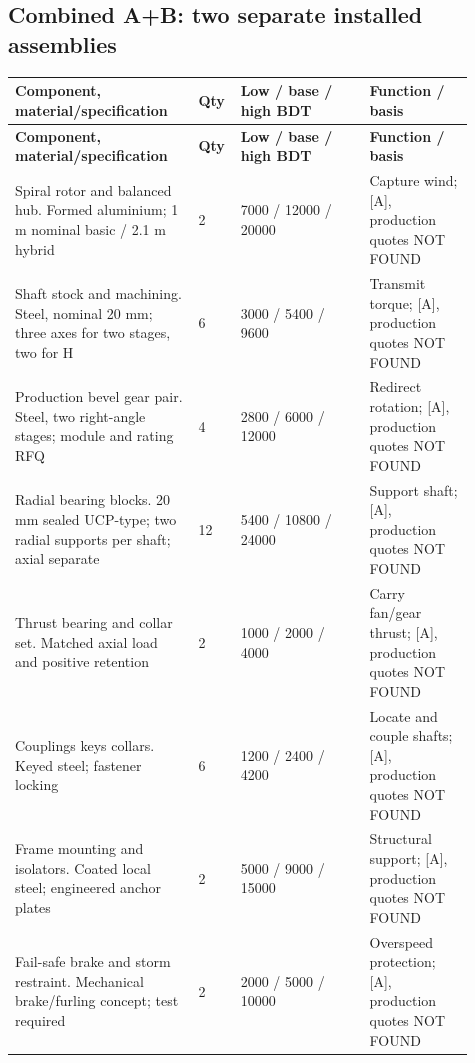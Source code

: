 \documentclass[11pt,a4paper]{article}
\begin{document}
\subsection{Combined A+B: two separate installed assemblies}
{\footnotesize
\setlength{\tabcolsep}{3pt}\renewcommand{\arraystretch}{1.18}
\begin{longtable}{@{}>{\raggedright\arraybackslash}p{0.3784\linewidth}>{\raggedright\arraybackslash}p{0.0541\linewidth}>{\raggedright\arraybackslash}p{0.2613\linewidth}>{\raggedright\arraybackslash}p{0.2162\linewidth}@{}}
\toprule \textbf{Component, material/specification} & \textbf{Qty} & \textbf{Low / base / high BDT} & \textbf{Function / basis} \\ \midrule
\endfirsthead\toprule \textbf{Component, material/specification} & \textbf{Qty} & \textbf{Low / base / high BDT} & \textbf{Function / basis} \\ \midrule
\endhead\bottomrule\endfoot
Spiral rotor and balanced hub. Formed aluminium; 1 m nominal basic / 2.1 m hybrid & \num{2} & \num{7000} / \num{12000} / \num{20000} & Capture wind; [A], production quotes NOT FOUND \\
Shaft stock and machining. Steel, nominal 20 mm; three axes for two stages, two for H & \num{6} & \num{3000} / \num{5400} / \num{9600} & Transmit torque; [A], production quotes NOT FOUND \\
Production bevel gear pair. Steel, two right-angle stages; module and rating RFQ & \num{4} & \num{2800} / \num{6000} / \num{12000} & Redirect rotation; [A], production quotes NOT FOUND \\
Radial bearing blocks. 20 mm sealed UCP-type; two radial supports per shaft; axial separate & \num{12} & \num{5400} / \num{10800} / \num{24000} & Support shaft; [A], production quotes NOT FOUND \\
Thrust bearing and collar set. Matched axial load and positive retention & \num{2} & \num{1000} / \num{2000} / \num{4000} & Carry fan/gear thrust; [A], production quotes NOT FOUND \\
Couplings keys collars. Keyed steel; fastener locking & \num{6} & \num{1200} / \num{2400} / \num{4200} & Locate and couple shafts; [A], production quotes NOT FOUND \\
Frame mounting and isolators. Coated local steel; engineered anchor plates & \num{2} & \num{5000} / \num{9000} / \num{15000} & Structural support; [A], production quotes NOT FOUND \\
Fail-safe brake and storm restraint. Mechanical brake/furling concept; test required & \num{2} & \num{2000} / \num{5000} / \num{10000} & Overspeed protection; [A], production quotes NOT FOUND \\

\end{longtable}}
\end{document}
